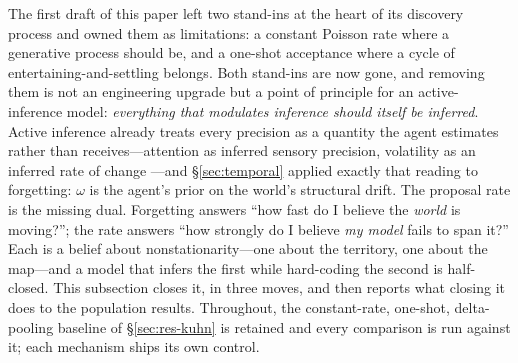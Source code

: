 \documentclass[11pt]{article}
\begin{document}
The first draft of this paper left two stand-ins at the heart of its discovery process and owned
them as limitations: a constant Poisson rate where a generative process should be, and a one-shot
acceptance where a cycle of entertaining-and-settling belongs. Both stand-ins are now gone, and
removing them is not an engineering upgrade but a point of principle for an active-inference
model: \emph{everything that modulates inference should itself be inferred}. Active inference
already treats every precision as a quantity the agent estimates rather than receives---attention
as inferred sensory precision, volatility as an inferred rate of change \citep{mathys2011,
parr2017uncertainty,friston2017process}---and \S\ref{sec:temporal} applied exactly that reading to
forgetting:
$\omega$ is the agent's prior on the world's structural drift. The proposal rate is the missing
dual. Forgetting answers ``how fast do I believe the \emph{world} is moving?''; the rate answers
``how strongly do I believe \emph{my model} fails to span it?'' Each is a belief about
nonstationarity---one about the territory, one about the map---and a model that infers the first
while hard-coding the second is half-closed. This subsection closes it, in three moves, and then
reports what closing it does to the population results. Throughout, the constant-rate,
one-shot, delta-pooling baseline of \S\ref{sec:res-kuhn} is retained and every comparison is run
against it; each mechanism ships its own control.
\end{document}
